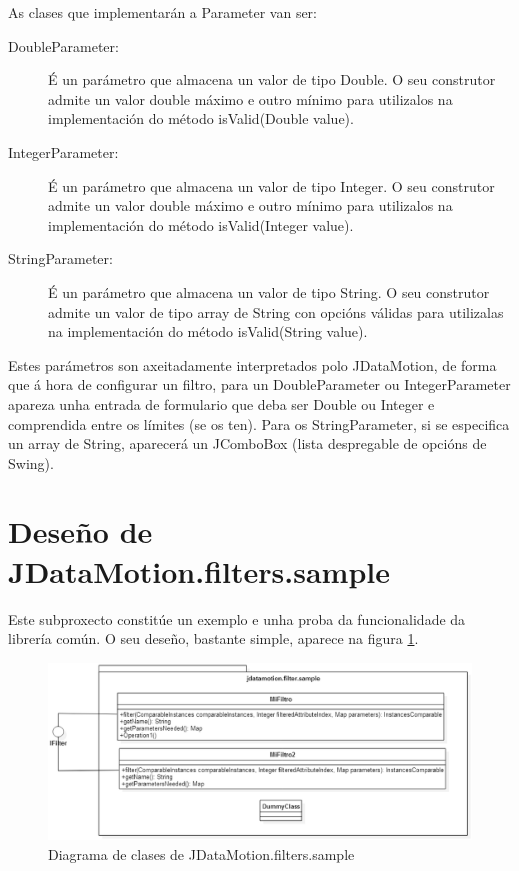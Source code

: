 As clases que implementarán a Parameter van ser:

\begin{description}
\item[DoubleParameter:] \hfill
É un parámetro que almacena un valor de tipo Double. O seu construtor admite un valor double máximo e outro mínimo para utilizalos na implementación do método isValid(Double value).
\item[IntegerParameter:] \hfill
É un parámetro que almacena un valor de tipo Integer. O seu construtor admite un valor double máximo e outro mínimo para utilizalos na implementación do método isValid(Integer value).
\item[StringParameter:] \hfill
É un parámetro que almacena un valor de tipo String. O seu construtor admite un valor de tipo array de String con opcións válidas para utilizalas na implementación do método isValid(String value).
\end{description}

Estes parámetros son axeitadamente interpretados polo JDataMotion, de forma que á hora de configurar un filtro, para un DoubleParameter ou IntegerParameter apareza unha entrada de formulario que deba ser Double ou Integer e comprendida entre os límites (se os ten). Para os StringParameter, si se especifica un array de String, aparecerá un JComboBox (lista despregable de opcións de Swing).

\section{Deseño de JDataMotion.filters.sample}

Este subproxecto constitúe un exemplo e unha proba da funcionalidade da librería común. O seu deseño, bastante simple, aparece na figura \ref{JDataMotionfilterssample}.

\begin{figure}
\centering
\includegraphics[width=\textwidth,height=\textheight,keepaspectratio]{figuras/JDataMotionfilterssample}
\caption{Diagrama de clases de JDataMotion.filters.sample}
\label{JDataMotionfilterssample}
\end{figure}


